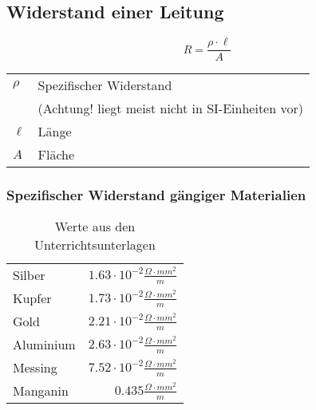



\subsection{Widerstand einer Leitung}
\[ R = \frac{\rho \cdot \ell}{A} \]
\begin{tabular}{lp{}}
$\rho$&Spezifischer Widerstand\\
&(Achtung! liegt meist nicht in SI-Einheiten vor)\\
$\ell$&Länge\\
   $A$&Fläche
\end{tabular}

\subsubsection{Spezifischer Widerstand gängiger Materialien}
\begin{table}[h!]
\begin{tabular}{lr}
  Silber    & $1.63 \cdot 10^{-2} \frac{\Omega \cdot mm^2}{m}$ \\
  Kupfer    & $1.73 \cdot 10^{-2} \frac{\Omega \cdot mm^2}{m}$ \\
  Gold      & $2.21 \cdot 10^{-2} \frac{\Omega \cdot mm^2}{m}$ \\
  Aluminium & $2.63 \cdot 10^{-2} \frac{\Omega \cdot mm^2}{m}$ \\
  Messing   & $7.52 \cdot 10^{-2} \frac{\Omega \cdot mm^2}{m}$ \\
  Manganin  & $0.435 \frac{\Omega \cdot mm^2}{m}$ \\
\end{tabular}
\label{tab_spezwid}
\caption{Werte aus den Unterrichtsunterlagen}
\end{table}